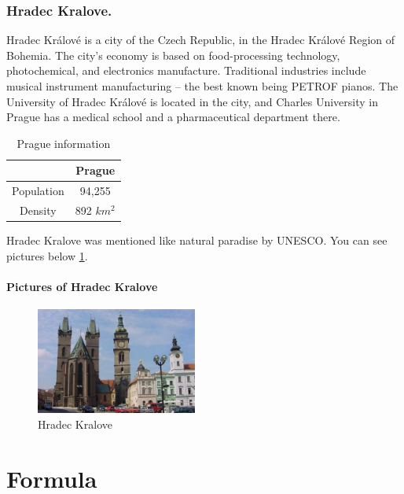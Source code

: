 \documentclass[a4paper, 12pt]{report}
\begin{document}
\newpage
	\subsection{Hradec Kralove.} \label{hradec}
Hradec Králové is a city of the Czech Republic, in the Hradec Králové Region of Bohemia. The city's economy is based on food-processing technology, photochemical, and electronics manufacture. Traditional industries include musical instrument manufacturing – the best known being PETROF pianos. The University of Hradec Králové is located in the city, and Charles University in Prague has a medical school and a pharmaceutical department there.

	\begin{table}[h]
		\begin{center}	
		\begin{tabular}{|c|c|}
		\hline
		  & Prague \\
		\hline
		 Population & 94,255 \\
		\hline
		 Density & 892 $km^{2}$ \\
		\hline
		\end{tabular}
		\caption{Prague information}
		\end{center}
	\end{table}

	Hradec Kralove was mentioned like natural paradise by UNESCO. You can see pictures below \ref{fig:kralove}.


	\subsubsection{Pictures of Hradec Kralove}
		\begin{figure}[h] %
			\centering
			\includegraphics[width=150pt]{hradeckralove_v.jpg}
			\caption{\label{fig:kralove} Hradec Kralove}	%
		\end{figure}

\newpage
\chapter{Formula}
\end{document}
